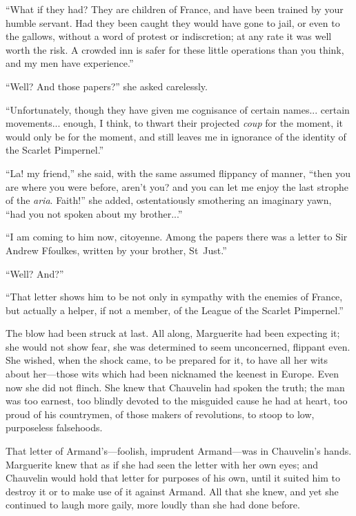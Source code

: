 \enquote{What if they had? They are children of France, and have been trained by your humble servant. Had they been caught they would have gone to jail, or even to the gallows, without a word of protest or indiscretion; at any rate it was well worth the risk. A crowded inn is safer for these little operations than you think, and my men have experience.}

\enquote{Well? And those papers?} she asked carelessly.

\enquote{Unfortunately, though they have given me cognisance of certain names... certain movements... enough, I think, to thwart their projected \textit{coup} for the moment, it would only be for the moment, and still leaves me in ignorance of the identity of the Scarlet Pimpernel.}

\enquote{La! my friend,} she said, with the same assumed flippancy of manner, \enquote{then you are where you were before, aren't you? and you can let me enjoy the last strophe of the \textit{aria}. Faith!} she added, ostentatiously smothering an imaginary yawn, \enquote{had you not spoken about my brother...}

\enquote{I am coming to him now, citoyenne. Among the papers there was a letter to Sir Andrew Ffoulkes, written by your brother, St~Just.}

\enquote{Well? And?}

\enquote{That letter shows him to be not only in sympathy with the enemies of France, but actually a helper, if not a member, of the League of the Scarlet Pimpernel.}

The blow had been struck at last. All along, Marguerite had been expecting it; she would not show fear, she was determined to seem unconcerned, flippant even. She wished, when the shock came, to be prepared for it, to have all her wits about her---those wits which had been nicknamed the keenest in Europe. Even now she did not flinch. She knew that Chauvelin had spoken the truth; the man was too earnest, too blindly devoted to the misguided cause he had at heart, too proud of his countrymen, of those makers of revolutions, to stoop to low, purposeless falsehoods.

That letter of Armand's---foolish, imprudent Armand---was in Chauvelin's hands. Marguerite knew that as if she had seen the letter with her own eyes; and Chauvelin would hold that letter for purposes of his own, until it suited him to destroy it or to make use of it against Armand. All that she knew, and yet she continued to laugh more gaily, more loudly than she had done before.

